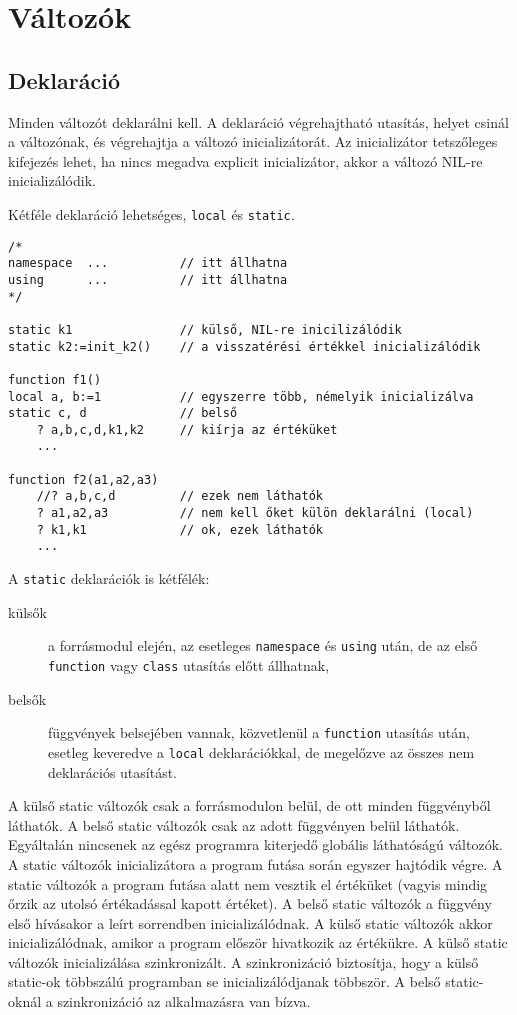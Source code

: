 

\section{Változók}


\subsection{Deklaráció}

Minden változót deklarálni kell.
A deklaráció végrehajtható utasítás, helyet csinál a változónak, 
és végrehajtja a változó inicializátorát.
Az inicializátor tetszőleges kifejezés lehet,
ha nincs megadva explicit inicializátor, akkor a változó NIL-re inicializálódik.


Kétféle deklaráció lehetséges, \verb!local! és \verb!static!.

\begin{verbatim}
/*
namespace  ...          // itt állhatna
using      ...          // itt állhatna
*/

static k1               // külső, NIL-re inicilizálódik
static k2:=init_k2()    // a visszatérési értékkel inicializálódik

function f1()
local a, b:=1           // egyszerre több, némelyik inicializálva
static c, d             // belső 
    ? a,b,c,d,k1,k2     // kiírja az értéküket
    ...

function f2(a1,a2,a3)
    //? a,b,c,d         // ezek nem láthatók
    ? a1,a2,a3          // nem kell őket külön deklarálni (local)
    ? k1,k1             // ok, ezek láthatók
    ...
\end{verbatim}
A \verb!static! deklarációk  is kétfélék:
\begin{description}
\item[külsők] a forrásmodul elején, 
        az esetleges \verb!namespace! és \verb!using! után,
        de az első \verb!function! vagy \verb!class! utasítás előtt állhatnak,
\item[belsők] 
        függvények belsejében vannak, 
        közvetlenül a \verb!function! utasítás után, 
        esetleg keveredve a \verb!local! deklarációkkal,
        de megelőzve az összes nem deklarációs utasítást.
\end{description}

A külső static változók csak a forrásmodulon belül, de ott minden függvényből láthatók. 
A belső static változók csak az adott függvényen belül láthatók. 
Egyáltalán nincsenek az egész programra kiterjedő globális láthatóságú változók.
A static változók inicializátora a program futása során egyszer hajtódik végre.
A static változók a program futása alatt nem vesztik el értéküket
(vagyis mindig őrzik az utolsó értékadással kapott értéket).
A belső static változók a függvény első hívásakor a leírt sorrendben inicializálódnak.
A külső static változók akkor inicializálódnak, amikor a program először hivatkozik 
az értékükre. A külső static változók inicializálása szinkronizált. A szinkronizáció 
biztosítja, hogy a külső static-ok többszálú programban se inicializálódjanak többször.
A belső static-oknál a szinkronizáció az alkalmazásra van bízva.

